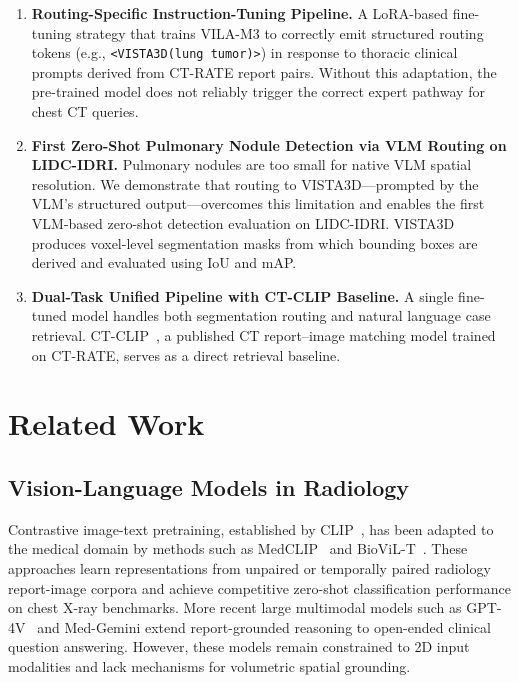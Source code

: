 \documentclass{iopconfser}
\begin{document}
\begin{enumerate}
  \item \textbf{Routing-Specific Instruction-Tuning Pipeline.} A LoRA-based
    fine-tuning strategy that trains VILA-M3 to correctly emit structured routing
    tokens (e.g., \texttt{<VISTA3D(lung tumor)>}) in response to thoracic
    clinical prompts derived from CT-RATE report pairs. Without this adaptation,
    the pre-trained model does not reliably trigger the correct expert pathway for
    chest CT queries.

  \item \textbf{First Zero-Shot Pulmonary Nodule Detection via VLM Routing on
    LIDC-IDRI.} Pulmonary nodules are too small for native VLM spatial resolution.
    We demonstrate that routing to VISTA3D---prompted by the VLM's structured
    output---overcomes this limitation and enables the first VLM-based zero-shot
    detection evaluation on LIDC-IDRI. VISTA3D produces voxel-level segmentation
    masks from which bounding boxes are derived and evaluated using IoU and mAP.

  \item \textbf{Dual-Task Unified Pipeline with CT-CLIP Baseline.} A single
    fine-tuned model handles both segmentation routing and natural language case
    retrieval. CT-CLIP~\cite{ctrate2024}, a published CT report--image matching
    model trained on CT-RATE, serves as a direct retrieval baseline.
\end{enumerate}


\section{Related Work}

\subsection{Vision-Language Models in Radiology}

Contrastive image-text pretraining, established by CLIP~\cite{clip2021}, has
been adapted to the medical domain by methods such as MedCLIP~\cite{medclip2022}
and BioViL-T~\cite{biovilt2023}. These approaches learn representations from
unpaired or temporally paired radiology report-image corpora and achieve
competitive zero-shot classification performance on chest X-ray benchmarks.
More recent large multimodal models such as GPT-4V~\cite{gpt4_2023} and
Med-Gemini extend report-grounded reasoning to open-ended clinical question
answering. However, these models remain constrained to 2D input modalities and
lack mechanisms for volumetric spatial grounding.
\end{document}
